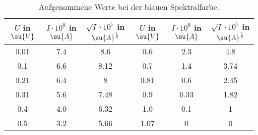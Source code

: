 \begin{table}
  \centering
  \label{tab:blau}
  \caption{Aufgenommene Werte bei der blauen Spektralfarbe.}
  \begin{tabular}{c c c | c c c}
    \toprule
    $U$ in $\su{V}$ & $I\cdot 10^{9}$ in $\su{A}$ & $\sqrt{I}\cdot10^{5}$ in $\su{A}^{\frac{1}{2}}$ &
    $U$ in $\su{V}$ & $I\cdot 10^{9}$ in $\su{A}$ & $\sqrt{I}\cdot10^{5}$ in $\su{A}^{\frac{1}{2}}$ \\
    \midrule
    0.01 & 7.4  & 8.6  & 0.6  & 2.3  & 4.8  \\
    0.1  & 6.6  & 8.12 & 0.7  & 1.4  & 3.74 \\
    0.21 & 6.4  & 8    & 0.81 & 0.6  & 2.45 \\
    0.31 & 5.6  & 7.48 & 0.9  & 0.33 & 1.82 \\
    0.4  & 4.0  & 6.32 & 1.0  & 0.1  & 1    \\
    0.5  & 3.2  & 5.66 & 1.07 & 0    & 0    \\
    \bottomrule
  \end{tabular}
\end{table}
